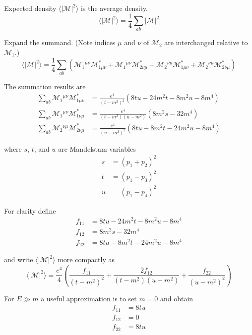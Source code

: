 Expected density $\langle|\mathcal M|^2\rangle$ is the average density.
\begin{equation*}
\langle|\mathcal M|^2\rangle
=\frac{1}{4}\sum_{ab}|\mathcal M|^2
\end{equation*}

Expand the summand.
(Note indices $\mu$ and $\nu$ of $\mathcal M_2$ are interchanged relative to $\mathcal M_1$.)
\begin{equation*}
\langle|\mathcal{M}|^2\rangle
=\frac{1}{4}\sum_{ab}
\left(
\mathcal M_{1}{}^{\mu\nu}\mathcal M^*_{1\mu\nu}
+\mathcal M_{1}{}^{\mu\nu}\mathcal M^*_{2\nu\mu}
+\mathcal M_{2}{}^{\nu\mu}\mathcal M^*_{1\mu\nu}
+\mathcal M_{2}{}^{\nu\mu}\mathcal M^*_{2\nu\mu}
\right)
\end{equation*}

The summation results are
\begin{align*}
\sum_{ab}\mathcal M_1{}^{\mu\nu}\mathcal M^*_{1\mu\nu}
&=\frac{e^4}{(t-m^2)^2}
\left(8 t u - 24 m^2 t - 8 m^2 u - 8 m^4\right)
\\
\sum_{ab}\mathcal M_1{}^{\mu\nu}\mathcal M^*_{1\nu\mu}
&=\frac{e^4}{(t-m^2)(u-m^2)}
\left(8 m^2 s - 32 m^4\right)
\\
\sum_{ab}\mathcal M_2{}^{\nu\mu}\mathcal M^*_{2\nu\mu}
&=\frac{e^4}{(u-m^2)^2}
\left(8 t u - 8 m^2 t - 24 m^2 u - 8 m^4\right)
\end{align*}

where $s$, $t$, and $u$ are Mandelstam variables
\begin{align*}
s&=(p_1+p_2)^2
\\
t&=(p_1-p_3)^2
\\
u&=(p_1-p_4)^2
\end{align*}

For clarity define
\begin{align*}
f_{11}&=8 t u - 24 m^2 t - 8 m^2 u - 8 m^4
\\
f_{12}&=8 m^2 s - 32 m^4
\\
f_{22}&=8 t u - 8 m^2 t - 24 m^2 u - 8 m^4
\end{align*}

and write $\langle|\mathcal{M}|^2\rangle$ more compactly as
\begin{equation*}
\langle|\mathcal{M}|^2\rangle=\frac{e^4}{4}
\left(
\frac{f_{11}}{(t-m^2)^2}+\frac{2f_{12}}{(t-m^2)(u-m^2)}+\frac{f_{22}}{(u-m^2)^2}
\right)
\end{equation*}

For $E\gg m$ a useful approximation is to set $m=0$ and obtain
\begin{align*}
f_{11}&=8tu
\\
f_{12}&=0
\\
f_{22}&=8tu
\end{align*}

